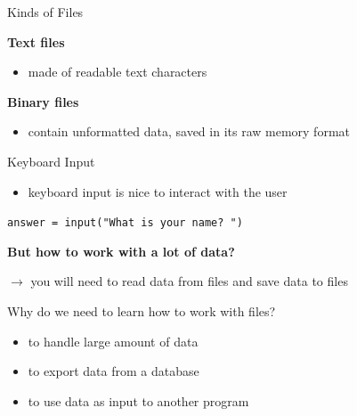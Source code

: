 \documentclass[
  american,
  ignorenonframetext,
]{beamer}
\providecommand{\tightlist}{%
  \setlength{\itemsep}{0pt}\setlength{\parskip}{0pt}}
\begin{document}
\begin{frame}{Kinds of Files}
\protect\hypertarget{kinds-of-files}{}

\textbf{Text files}

\begin{itemize}
\tightlist
\item
  made of readable text characters \vspace{1.5em}
\end{itemize}

\textbf{Binary files}

\begin{itemize}
\tightlist
\item
  contain unformatted data, saved in its raw memory format
\end{itemize}


\end{frame}

\begin{frame}{Keyboard Input}
\protect\hypertarget{keyboard-input}{}

\begin{itemize}
\tightlist
\item
  keyboard input is nice to interact with the user
\end{itemize}

\texttt{answer\ =\ input("What\ is\ your\ name?\ ")} \vspace{2em}

\textbf{But how to work with a lot of data?}

\(\rightarrow\) you will need to read data from files and save data to
files

\end{frame}

\begin{frame}{Why do we need to learn how to work with
files?}
\protect\hypertarget{why-do-we-need-to-learn-how-to-work-with-files}{}

\begin{itemize}
\item
  to handle large amount of data
\item
  to export data from a database
\item
  to use data as input to another program
\end{itemize}


\end{frame}
\end{document}
